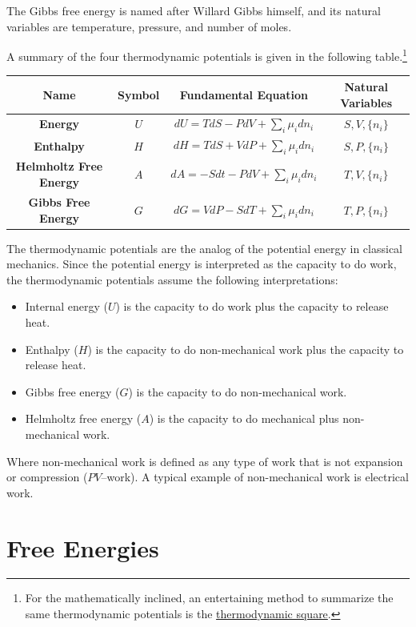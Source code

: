 \documentclass[
]{book}
\providecommand{\tightlist}{%
  \setlength{\itemsep}{0pt}\setlength{\parskip}{0pt}}
\theoremstyle{definition}
\theoremstyle{definition}
\theoremstyle{definition}
\theoremstyle{remark}
\begin{document}
The Gibbs free energy is named after Willard Gibbs himself, and its natural variables are temperature, pressure, and number of moles.

A summary of the four thermodynamic potentials is given in the following table.\footnote{For the mathematically inclined, an entertaining method to summarize the same thermodynamic potentials is the \href{https://en.wikipedia.org/wiki/Thermodynamic_square}{thermodynamic square}.}

\scriptsize

\begin{longtable}[]{@{}cccc@{}}
\toprule
\textbf{Name} & \textbf{Symbol} & \textbf{Fundamental Equation} & \textbf{Natural Variables}\tabularnewline
\midrule
\endhead
\textbf{Energy} & \(U\) & \(dU=TdS-PdV+\sum_i\mu_i dn_i\) & \(S,V,\{n_i\}\)\tabularnewline
\textbf{Enthalpy} & \(H\) & \(dH=TdS+VdP+\sum_i\mu_i dn_i\) & \(S,P,\{n_i\}\)\tabularnewline
\textbf{Helmholtz Free Energy} & \(A\) & \(dA=-Sdt-PdV+\sum_i\mu_i dn_i\) & \(T,V,\{n_i\}\)\tabularnewline
\textbf{Gibbs Free Energy} & \(G\) & \(dG=VdP-SdT+\sum_i\mu_i dn_i\) & \(T,P,\{n_i\}\)\tabularnewline
\bottomrule
\end{longtable}

\normalsize

The thermodynamic potentials are the analog of the potential energy in classical mechanics. Since the potential energy is interpreted as the capacity to do work, the thermodynamic potentials assume the following interpretations:

\begin{itemize}
\tightlist
\item
  Internal energy (\(U\)) is the capacity to do work plus the capacity to release heat.
\item
  Enthalpy (\(H\)) is the capacity to do non-mechanical work plus the capacity to release heat.
\item
  Gibbs free energy (\(G\)) is the capacity to do non-mechanical work.
\item
  Helmholtz free energy (\(A\)) is the capacity to do mechanical plus non-mechanical work.
\end{itemize}

Where non-mechanical work is defined as any type of work that is not expansion or compression (\(PV\)--work). A typical example of non-mechanical work is electrical work.

\hypertarget{freeenergies}{%
\section{Free Energies}\label{freeenergies}}
\end{document}

